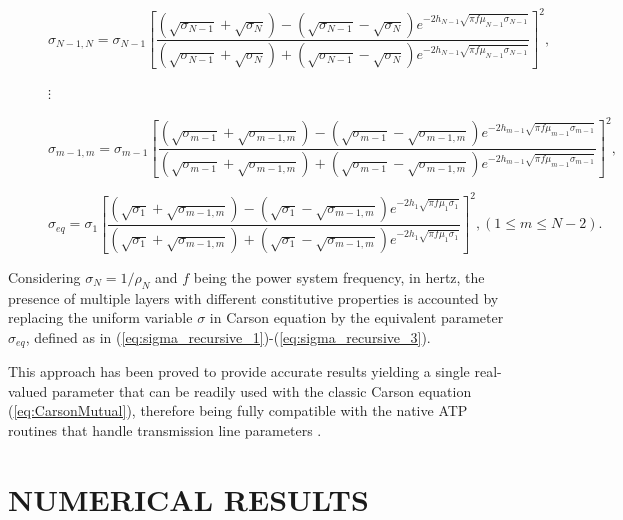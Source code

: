 \documentclass[conference]{IEEEtran}
\begin{document}
	
	
	\begin{figure}[ht]
		\begin{equation}\label{eq:sigma_recursive_1}
			\sigma_{N-1,N}=\sigma_{N-1} \left[\frac{(\sqrt{\sigma_{N-1}}+\sqrt{\sigma_N})-(\sqrt{\sigma_{N-1}}-\sqrt{\sigma_N})e^{-2h_{N-1}\sqrt{\pi f \mu_{N-1}\sigma_{N-1}}}}{(\sqrt{\sigma_{N-1}}+\sqrt{\sigma_N})+(\sqrt{\sigma_{N-1}}-\sqrt{\sigma_N})e^{-2h_{N-1}\sqrt{\pi f \mu_{N-1}\sigma_{N-1}}}}\right]^2, 
		\end{equation}
		\begin{center}
			$\vdots$
		\end{center}
		\begin{equation}\label{eq:sigma_recursive_2}
			\sigma_{m-1,m}=\sigma_{m-1} \left[\frac{(\sqrt{\sigma_{m-1}}+\sqrt{\sigma_{m-1,m}})-(\sqrt{\sigma_{m-1}}-\sqrt{\sigma_{m-1,m}})e^{-2h_{m-1}\sqrt{\pi f \mu_{m-1}\sigma_{m-1}}}}{(\sqrt{\sigma_{m-1}}+\sqrt{\sigma_{m-1,m}})+(\sqrt{\sigma_{m-1}}-\sqrt{\sigma_{m-1,m}})e^{-2h_{m-1}\sqrt{\pi f \mu_{m-1}\sigma_{m-1}}}}\right]^2,
		\end{equation}
		
		\begin{equation}\label{eq:sigma_recursive_3}
			\sigma_{eq}=\sigma_1 \left[\frac{(\sqrt{\sigma_1}+\sqrt{\sigma_{m-1,m}})-(\sqrt{\sigma_1}-\sqrt{\sigma_{m-1,m}})e^{-2h_1\sqrt{\pi f \mu_1\sigma_1}}}{(\sqrt{\sigma_1}+\sqrt{\sigma_{m-1,m}})+(\sqrt{\sigma_1}-\sqrt{\sigma_{m-1,m}})e^{-2h_1\sqrt{\pi f \mu_1\sigma_1}}}\right]^2, (1\leq m \leq N-2).
		\end{equation}
		
		\hrulefill
	\end{figure} 
	
	
	Considering $\sigma_{N} = 1/\rho_{N}$  and $f$ being the power system frequency, in hertz, the presence of multiple layers with different constitutive properties is accounted by replacing the uniform variable $\sigma$ in Carson equation by the equivalent parameter $\sigma_{eq}$, defined as in (\ref{eq:sigma_recursive_1})-(\ref{eq:sigma_recursive_3}).
	
	This approach has been proved to provide accurate results yielding a single real-valued parameter that can be readily used with the classic Carson equation (\ref{eq:CarsonMutual}), therefore being fully compatible with the native ATP routines that handle transmission line parameters \cite{Martins-Britto2019}.
	
	
	\section{NUMERICAL RESULTS}
	
\end{document}
